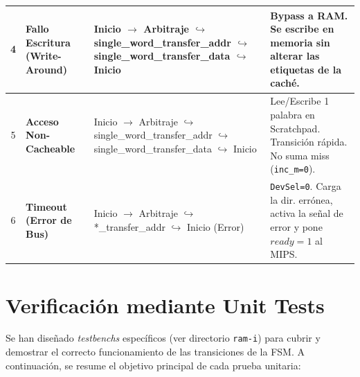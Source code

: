 \documentclass[12pt,a4paper]{article}
\begin{document}
\begin{table}[H]
\begin{tabularx}{\textwidth}{@{} c >{\bfseries}p{3cm} >{\small\ttfamily}X p{4cm} @{}}
    4 & Fallo Escritura \newline (Write-Around) & 
    Inicio $\rightarrow$ Arbitraje \newline
    $\hookrightarrow$ single\_word\_transfer\_addr \newline
    $\hookrightarrow$ single\_word\_transfer\_data \newline
    $\hookrightarrow$ Inicio & 
    Bypass a RAM. Se escribe en memoria sin alterar las etiquetas de la caché. \\
    \midrule

    5 & Acceso \newline Non-Cacheable & 
    Inicio $\rightarrow$ Arbitraje \newline
    $\hookrightarrow$ single\_word\_transfer\_addr \newline
    $\hookrightarrow$ single\_word\_transfer\_data \newline
    $\hookrightarrow$ Inicio & 
    Lee/Escribe 1 palabra en Scratchpad. Transición rápida. No suma miss (\texttt{inc\_m=0}). \\
    \midrule

    6 & Timeout \newline (Error de Bus) & 
    Inicio $\rightarrow$ Arbitraje \newline
    $\hookrightarrow$ *\_transfer\_addr \newline
    $\hookrightarrow$ Inicio (Error) & 
    \texttt{DevSel=0}. Carga la dir. errónea, activa la señal de error y pone $ready=1$ al MIPS. \\
    \bottomrule

    \end{tabularx}
    \end{table}

    \section{Verificación mediante Unit Tests}

    Se han diseñado \textit{testbenchs} específicos (ver directorio \texttt{ram-i}) para cubrir y demostrar el correcto funcionamiento de las transiciones de la FSM. A continuación, se resume el objetivo principal de cada prueba unitaria:
\end{document}
